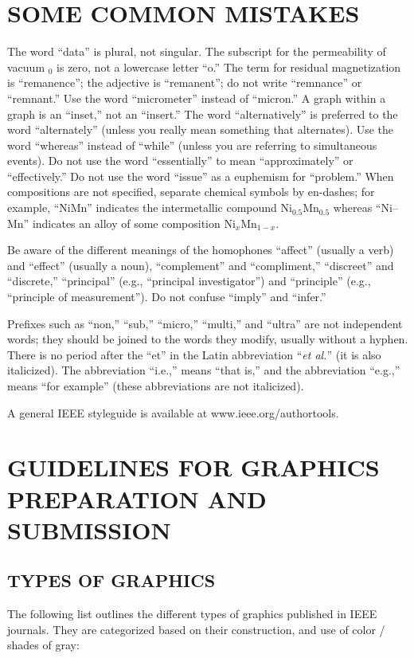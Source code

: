 \documentclass{IEEEoj}
\begin{document}
\section{SOME COMMON MISTAKES}
The word ``data'' is plural, not singular. The subscript for the 
permeability of vacuum \textmu $_{0}$ is zero, not a lowercase letter ``o.'' 
The term for residual magnetization is ``remanence''; the adjective is 
``remanent''; do not write ``remnance'' or ``remnant.'' Use the word 
``micrometer'' instead of ``micron.'' A graph within a graph is an 
``inset,'' not an ``insert.'' The word ``alternatively'' is preferred to the 
word ``alternately'' (unless you really mean something that alternates). Use 
the word ``whereas'' instead of ``while'' (unless you are referring to 
simultaneous events). Do not use the word ``essentially'' to mean 
``approximately'' or ``effectively.'' Do not use the word ``issue'' as a 
euphemism for ``problem.'' When compositions are not specified, separate 
chemical symbols by en-dashes; for example, ``NiMn'' indicates the 
intermetallic compound Ni$_{0.5}$Mn$_{0.5}$ whereas ``Ni--Mn'' indicates an 
alloy of some composition Ni$_{x}$Mn$_{1-x}$.

Be aware of the different meanings of the homophones ``affect'' (usually a 
verb) and ``effect'' (usually a noun), ``complement'' and ``compliment,'' 
``discreet'' and ``discrete,'' 
``principal'' (e.g., ``principal investigator'') and ``principle'' 
(e.g., ``principle of measurement''). Do not confuse ``imply'' and 
``infer.'' 

Prefixes such as ``non,'' ``sub,'' ``micro,'' ``multi,'' and ``ultra'' are 
not independent words; they should be joined to the words they modify, 
usually without a hyphen. There is no period after the ``et'' in the Latin 
abbreviation ``\textit{et al.}'' (it is also italicized). The abbreviation ``i.e.,'' means 
``that is,'' and the abbreviation ``e.g.,'' means ``for example'' (these 
abbreviations are not italicized).

A general IEEE styleguide is available at www.ieee.org/\break authortools.

\section{GUIDELINES FOR GRAPHICS PREPARATION 
AND SUBMISSION}
\subsection{TYPES OF GRAPHICS}
The following list outlines the different types of graphics published in 
IEEE journals. They are categorized based on their construction, and use of 
color / shades of gray:
\end{document}
